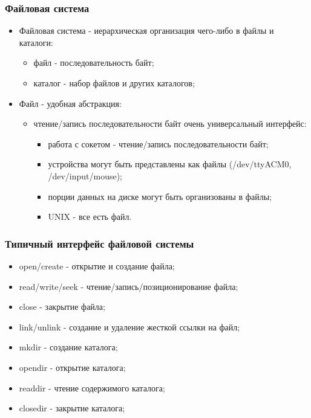 \begin{frame}
\frametitle{Файловая система}
\begin{itemize}
  \item<1-> Файловая система - иерархическая организация чего-либо в файлы и каталоги:
    \begin{itemize}
      \item файл - последовательность байт;
      \item каталог - набор файлов и других каталогов;
    \end{itemize}
  \item<2-> Файл - удобная абстракция:
    \begin{itemize}
      \item чтение/запись последовательности байт очень универсальный интерфейс:
        \begin{itemize}
          \item работа с сокетом - чтение/запись последовательности байт;
          \item устройства могут быть представлены как файлы (/dev/ttyACM0, /dev/input/mouse);
          \item порции данных на диске могут быть организованы в файлы;
          \item UNIX - все есть файл.
        \end{itemize}
    \end{itemize}
\end{itemize}
\end{frame}

\begin{frame}
\frametitle{Типичный интерфейс файловой системы}
\begin{itemize}
  \item open/create - открытие и создание файла;
  \item read/write/seek - чтение/запись/позиционирование файла;
  \item close - закрытие файла;
  \item link/unlink - создание и удаление жесткой ссылки на файл;
  \item mkdir - создание каталога;
  \item opendir - открытие каталога;
  \item readdir - чтение содержимого каталога;
  \item closedir - закрытие каталога;
\end{itemize}
\end{frame}

